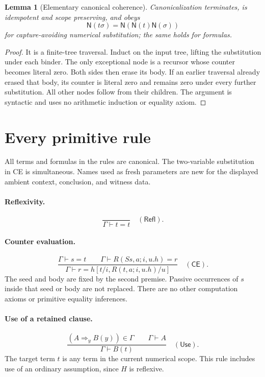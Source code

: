 \documentclass[10pt,letterpaper]{article}
\newtheorem{lemma}[theorem]{Lemma}
\theoremstyle{definition}
\theoremstyle{remark}
\newcommand{\NF}{\mathsf N}
\newcommand{\Use}{\mathsf{Use}}
\newcommand{\CE}{\mathsf{CE}}
\newcommand{\Refl}{\mathsf{Refl}}
\begin{document}
\begin{lemma}[Elementary canonical coherence]\label{lem:canonical}
Canonicalization terminates, is idempotent and scope preserving, and obeys
\[
 \NF(t\sigma)=\NF(\NF(t)\NF(\sigma))
\]
for capture-avoiding numerical substitution; the same holds for formulas.
\end{lemma}
\begin{proof}
It is a finite-tree traversal. Induct on the input tree, lifting the
substitution under each binder. The only exceptional node is a recursor
whose counter becomes literal zero. Both sides then erase its body.
If an earlier traversal already erased that body, its counter is literal
zero and remains zero under every further substitution. All other nodes
follow from their children. The argument is syntactic and uses no
arithmetic induction or equality axiom.
\end{proof}

\section{Every primitive rule}\label{sec:rules}

All terms and formulas in the rules are canonical. The two-variable
substitution in CE is simultaneous. Names used as fresh parameters are
new for the displayed ambient context, conclusion, and witness data.

\paragraph{Reflexivity.}
\[
 \frac{\ }{\Gamma\vdash t=t}\quad(\Refl).
\]

\paragraph{Counter evaluation.}
\[
 \frac{\Gamma\vdash s=t
       \qquad \Gamma\vdash R(Ss,a;i,u.h)=r}
      {\Gamma\vdash r=h[t/i,R(t,a;i,u.h)/u]}
 \quad(\CE).
 \tag{CE}
\]
The seed and body are fixed by the second premise. Passive occurrences
of $s$ inside that seed or body are not replaced. There are no other
computation axioms or primitive equality inferences.

\paragraph{Use of a retained clause.}
\[
 \frac{(A\Rightarrow_y B(y))\in\Gamma
       \qquad\Gamma\vdash A}
      {\Gamma\vdash B(t)}
 \quad(\Use).
\]
The target term $t$ is any term in the current numerical scope.
This rule includes use of an ordinary assumption, since $H$ is reflexive.
\end{document}
